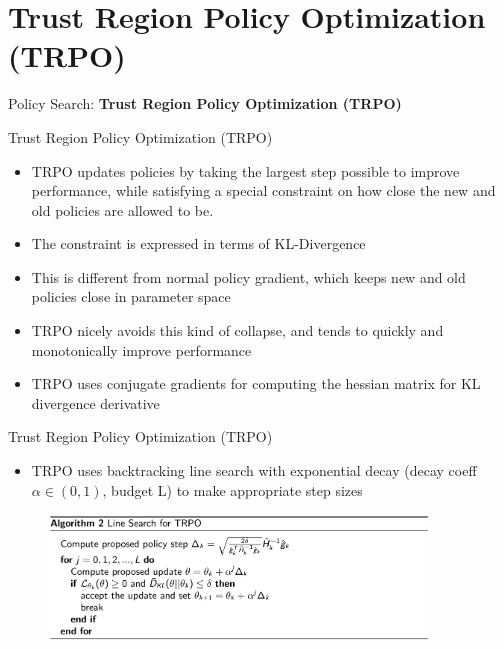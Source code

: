 \section{Trust Region Policy Optimization (TRPO)}
\begin{frame}{}
    \LARGE Policy Search: \textbf{Trust Region Policy Optimization (TRPO)}
\end{frame}

\begin{frame}{Trust Region Policy Optimization (TRPO)}
\begin{itemize}
    \item TRPO updates policies by taking the largest step possible to improve performance, while satisfying a special constraint on how close the new and old policies are allowed to be.
    \item The constraint is expressed in terms of KL-Divergence
    \item This is different from normal policy gradient, which keeps new and old policies close in parameter space
    \item TRPO nicely avoids this kind of collapse, and tends to quickly and monotonically improve performance
    \item TRPO uses conjugate gradients for computing the hessian matrix for KL divergence derivative
\end{itemize}

    
\end{frame}

\begin{frame}{Trust Region Policy Optimization (TRPO)}
\begin{itemize}
    \item TRPO uses backtracking line search with exponential decay (decay coeff $\alpha \in (0, 1)$, budget L) to make appropriate step sizes
    
\end{itemize}

\begin{figure}
\centering
\includegraphics[width=0.9\textwidth,height=0.6\textheight,keepaspectratio]{images/policy-search/trpo_1.png}
\end{figure}
    
\end{frame}

